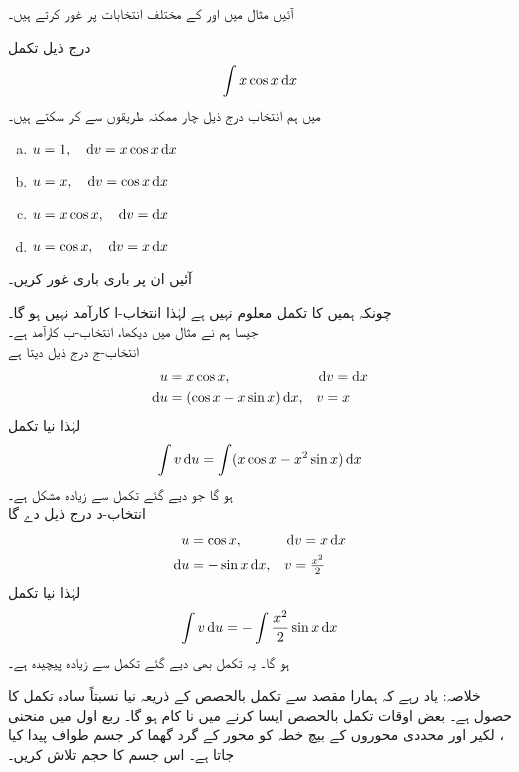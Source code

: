 آئیں مثال  میں  اور  کے مختلف انتخابات پر غور کرتے ہیں۔  

درج ذیل تکمل
\begin{align*}
\int x\cos x\dif x
\end{align*}
میں ہم  انتخاب درج ذیل چار ممکنہ طریقوں سے کر سکتے ہیں۔ 
\begin{enumerate}[a.]
\item
$u=1,\quad \dif v=x\cos x\dif x$
\item
$u=x,\quad \dif v=\cos x\dif x$
\item
$u=x\cos x,\quad \dif v=\dif x$
\item
$u=\cos x,\quad \dif v=x\dif x$
\end{enumerate}
آئیں ان پر باری باری غور کریں۔

چونکہ ہمیں  کا تکمل معلوم نہیں ہے لہٰذا انتخاب-ا کارآمد نہیں ہو گا۔\\
جیسا ہم نے مثال  میں دیکھا، انتخاب-ب کارآمد ہے۔\\
انتخاب-ج درج ذیل دیتا ہے
\begin{align*}
u&=x\cos x,&&\dif v=\dif x\\
\dif u&=(\cos x-x\sin x)\dif x,&&v=x
\end{align*}
لہٰذا نیا تکمل
\begin{align*}
\int v\dif u=\int(x\cos x-x^2\sin x)\dif x
\end{align*}
ہو گا جو دیے گئے تکمل سے زیادہ مشکل ہے۔\\
انتخاب-د درج ذیل دے گا
\begin{align*}
u&=\cos x,&&\dif v=x\dif x\\
\dif u&=-\sin x\dif x,&&v=\tfrac{x^2}{2}
\end{align*}
لہٰذا نیا تکمل
\begin{align*}
\int v\dif u=-\int\frac{x^2}{2}\sin x\dif x
\end{align*}
ہو گا۔ یہ تکمل بھی دیے گئے تکمل سے زیادہ پیچیدہ ہے۔

خلاصہ: یاد رہے کہ ہمارا مقصد  سے تکمل بالحصص کے ذریعہ  نیا نسبتاً سادہ تکمل کا حصول ہے۔ بعض اوقات تکمل بالحصص  ایسا کرنے میں نا کام ہو گا۔ 
ربع اول میں منحنی ، لکیر  اور محددی محوروں کے بیچ خطہ کو محور  کے گرد گھما کر جسم طواف پیدا کیا جاتا ہے۔ اس جسم کا حجم تلاش کریں۔

